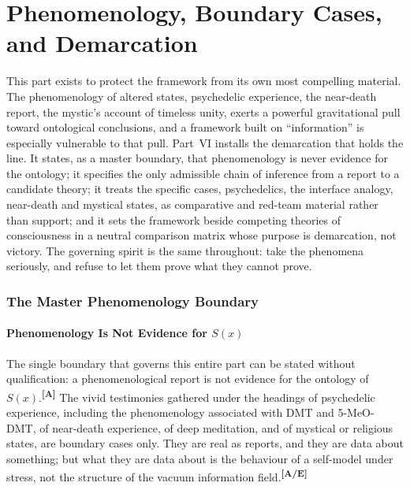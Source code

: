 \documentclass[12pt,a4paper,twoside]{article}
\theoremstyle{plain}
\theoremstyle{definition}
\theoremstyle{remark}
\newcommand{\catmark}[1]{\textsuperscript{\textsf{\textbf{[#1]}}}}
\begin{document}
\part{Phenomenology, Boundary Cases, and Demarcation}
\label{part:phenomenology-demarcation}

\noindent This part exists to protect the framework from its own most compelling material. The phenomenology of altered states, psychedelic experience, the near-death report, the mystic's account of timeless unity, exerts a powerful gravitational pull toward ontological conclusions, and a framework built on ``information'' is especially vulnerable to that pull. Part~VI installs the demarcation that holds the line. It states, as a master boundary, that phenomenology is never evidence for the ontology; it specifies the only admissible chain of inference from a report to a candidate theory; it treats the specific cases, psychedelics, the interface analogy, near-death and mystical states, as comparative and red-team material rather than support; and it sets the framework beside competing theories of consciousness in a neutral comparison matrix whose purpose is demarcation, not victory. The governing spirit is the same throughout: take the phenomena seriously, and refuse to let them prove what they cannot prove.

\newpage
\section{The Master Phenomenology Boundary}
\label{sec:master-phenomenology-boundary}

\subsection{Phenomenology Is Not Evidence for \texorpdfstring{$S(x)$}{S(x)}}
\label{subsec:phenomenology-not-evidence}

The single boundary that governs this entire part can be stated without qualification: a phenomenological report is not evidence for the ontology of $S(x)$.\catmark{A} The vivid testimonies gathered under the headings of psychedelic experience, including the phenomenology associated with DMT and 5-MeO-DMT, of near-death experience, of deep meditation, and of mystical or religious states, are boundary cases only. They are real as reports, and they are data about something; but what they are data about is the behaviour of a self-model under stress, not the structure of the vacuum information field.\catmark{A/E}
\end{document}
